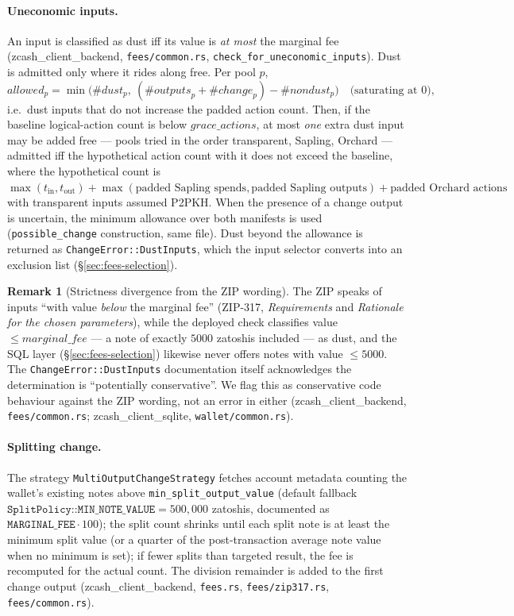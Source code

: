 \documentclass[11pt,a4paper]{article}
\theoremstyle{definition}
\newtheorem{remark}[theorem]{Remark}
\begin{document}
\paragraph{Uneconomic inputs.} An input is classified as dust iff its
value is \emph{at most} the marginal fee
(\textsf{zcash\_client\_backend}, \texttt{fees/common.rs},
\texttt{check\_for\_uneconomic\_inputs}). Dust is admitted only where it
rides along free. Per pool $p$,
\[
\mathit{allowed}_p = \min\bigl(\#\mathit{dust}_p,\
(\#\mathit{outputs}_p + \#\mathit{change}_p) - \#\mathit{nondust}_p\bigr)
\quad\text{(saturating at $0$)},
\]
i.e.\ dust inputs that do not increase the padded action count. Then, if
the baseline logical-action count is below $\mathit{grace\_actions}$, at
most \emph{one} extra dust input may be added free --- pools tried in the
order transparent, Sapling, Orchard --- admitted iff the hypothetical
action count with it does not exceed the baseline, where the hypothetical
count is $\max(t_{\mathrm{in}}, t_{\mathrm{out}}) + \max(\text{padded
Sapling spends}, \text{padded Sapling outputs}) + \text{padded Orchard
actions}$ with transparent inputs assumed P2PKH. When the presence of a
change output is uncertain, the minimum allowance over both manifests is
used (\texttt{possible\_change} construction, same file). Dust beyond the
allowance is returned as \texttt{ChangeError::DustInputs}, which the input
selector converts into an exclusion list (\S\ref{sec:fees-selection}).

\begin{remark}[Strictness divergence from the ZIP wording]%
\label{rem:dust-strictness}
The ZIP speaks of inputs ``with value \emph{below} the marginal
fee'' (ZIP-317, \emph{Requirements} and \emph{Rationale for the chosen
parameters}), while the deployed
check classifies value $\le \mathit{marginal\_fee}$ --- a note of exactly
$5000$ zatoshis included --- as dust, and the SQL layer
(\S\ref{sec:fees-selection}) likewise never offers notes with value
$\le 5000$. The \texttt{ChangeError::DustInputs} documentation itself
acknowledges the determination is ``potentially conservative''. We flag
this as conservative code behaviour against the ZIP wording, not an error
in either (\textsf{zcash\_client\_backend}, \texttt{fees/common.rs};
\textsf{zcash\_client\_sqlite}, \texttt{wallet/common.rs}).
\end{remark}

\paragraph{Splitting change.} The strategy
\texttt{MultiOutputChangeStrategy} fetches account metadata counting the
wallet's existing notes above \texttt{min\_split\_output\_value} (default
fallback $\texttt{SplitPolicy::MIN\_NOTE\_VALUE} = 500{,}000$ zatoshis,
documented as $\texttt{MARGINAL\_FEE} \cdot 100$); the split count shrinks
until each split note is at least the minimum split value (or a quarter of
the post-transaction average note value when no minimum is set); if fewer
splits than targeted result, the fee is recomputed for the actual count.
The division remainder is added to the first change output
(\textsf{zcash\_client\_backend}, \texttt{fees.rs},
\texttt{fees/zip317.rs}, \texttt{fees/common.rs}).
\end{document}
